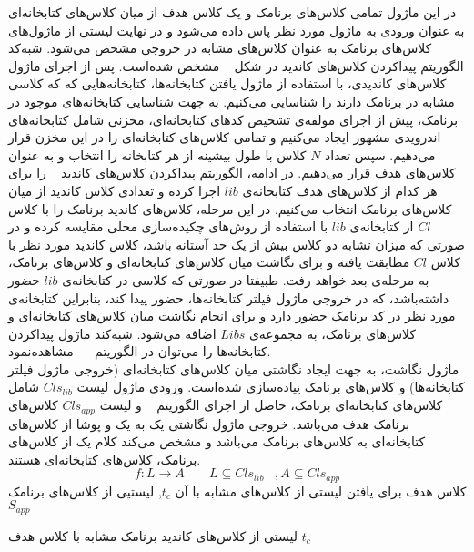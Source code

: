  در این ماژول تمامی کلاس‌های برنامک و یک کلاس هدف از میان کلاس‌های کتابخانه‌ای به عنوان ورودی به ماژول مورد نظر پاس داده می‌شود و در نهایت لیستی از ماژول‌های کلاس‌های برنامک به عنوان کلاس‌های مشابه در خروجی مشخص می‌شود. شبه‌کد الگوریتم پیداکردن کلاس‌های کاندید در  شکل ~ مشخص شده‌است. پس از اجرای ماژول کلاس‌های کاندیدی،‌ با استفاده از ماژول یافتن کتابخانه‌ها، کتابخانه‌هایی که که کلاسی مشابه در برنامک‌ دارند را شناسایی می‌کنیم. به جهت شناسایی کتابخانه‌‌های موجود در برنامک، پیش از اجرای مولفه‌ی تشخیص کد‌های کتابخانه‌ای، مخزنی شامل کتابخانه‌های اندرویدی مشهور ایجاد می‌کنیم و تمامی کلاس‌های کتابخانه‌ای را در این مخزن قرار می‌دهیم. سپس تعداد $N$ کلاس با طول بیشینه از هر کتابخانه‌ را انتخاب و به عنوان کلاس‌های هدف قرار می‌دهیم. در ادامه، الگوریتم پیدا‌کردن کلاس‌های کاندید ~ را برای هر کدام از کلاس‌های هدف کتابخانه‌ی $lib$ اجرا کرده و تعدادی کلاس کاندید از میان کلاس‌های برنامک انتخاب می‌کنیم. در این مرحله، کلاس‌های کاندید برنامک را با کلاس $Cl$ از کتابخانه‌ی $lib$ با استفاده از روش‌های چکیده‌سازی محلی مقایسه کرده و در صورتی که میزان تشابه دو کلاس بیش از یک حد آستانه باشد، کلاس کاندید مورد نظر با کلاس $Cl$ مطابقت یافته و برای نگاشت میان کلاس‌های کتابخانه‌ای و کلاس‌های برنامک، به مرحله‌ی بعد خواهد رفت. طبیفتا در صورتی که کلاسی در کتابخانه‌ی $lib$ حضور داشته‌باشد، که در خروجی ماژول فیلتر کتابخانه‌ها، حضور پیدا کند، بنابراین کتابخانه‌ی مورد نظر در کد برنامک حضور دارد و برای انجام نگاشت میان کلاس‌های کتابخانه‌ای و کلاس‌های برنامک، به مجموعه‌ی $Libs$ اضافه می‌شود. شبه‌کند ماژول پیدا‌کردن کتابخانه‌ها را می‌توان در الگوریتم --- مشاهده‌نمود.\\ 

  ماژول نگاشت، به جهت ایجاد نگاشتی میان کلاس‌های کتابخانه‌ای (خروجی ماژول فیلتر کتابخانه‌ها)‌ و کلاس‌های برنامک پیاده‌سازی شده‌است. ورودی ماژول لیست $Cls_{lib}$  شامل کلاس‌های کتابخانه‌ای برنامک، حاصل از اجرای الگوریتم ~ و لیست $Cls_{app}$ کلاس‌های برنامک هدف می‌باشد. خروجی ماژول نگاشتی یک به یک و پوشا از کلاس‌های کتابخانه‌ای به کلاس‌های برنامک می‌باشد و مشخص می‌کند کلام یک از کلاس‌های برنامک، کلاس‌های کتابخانه‌ای هستند. 
  \begin{equation}
  	f: L \rightarrow A  \;\;\;\;\;\;\; L\subseteq Cls_{lib}  \;\;\; , A \subseteq Cls_{app}
  \end{equation}
 کلاس هدف برای یافتن لیستی از کلاس‌های مشابه با آن $t_c$, لیستیی از کلاس‌های برنامک $S_{app}$

 لیستی از کلاس‌های کاندید برنامک مشابه با کلاس هدف $t_c$

